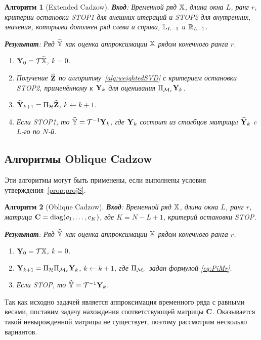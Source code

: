 \documentclass[12pt,a4paper,fleqn,leqno]{article}
\newtheorem{algorithm}{Алгоритм}%
\begin{document}
\begin{algorithm}[Extended Cadzow]
\textbf{Вход}: Временной ряд $\mathbb{X}$, длина окна $L$, ранг $r$,
критерии остановки STOP1 для внешних итераций и STOP2 для внутренних,
значения, которыми дополнен ряд слева и справа, $\mathbb{L}_{L-1}$ и $\mathbb{R}_{L-1}$.

\textbf{Результат}:
Ряд $\widehat{\mathbb{Y}}$ как оценка аппроксимации $\mathbb{X}$ рядом конечного ранга $r$.

\begin{enumerate}
\item
$\mathbf{Y}_0 = \mathcal{T} \widetilde{\mathbb{X}}$, $k=0$.
\item
Получение $\widehat{\mathbf{Z}}$ по алгоритму~\ref{alg:weightedSVD} с критерием остановки STOP2, применённому к $\mathbf{Y}_k$ для оценивания $\Pi_{\mathcal{M}_r} \mathbf{Y}_{k}$.
\item
$\widetilde{\mathbf{Y}}_{k+1} = \Pi_{\mathcal{H}}  \widehat{\mathbf{Z}}$, $k\leftarrow k+1$.
\item
Если STOP1, то $\widehat{\mathbb{Y}} = \mathcal{T}^{-1} \mathbf{Y}_k$, где $\mathbf{Y}_k$ состоит из столбцов матрицы $\widetilde{\mathbf{Y}}_{k}$
c $L$-го по $N$-й.
\end{enumerate}
\end{algorithm}

\subsection{Алгоритмы Oblique Cadzow}

Эти алгоритмы могут быть применены, если выполнены условия утверждения~\ref{prop:projS}.

\begin{algorithm}[Oblique Cadzow]
\label{alg:obliqueCadzow}
\textbf{Вход}: Временной ряд $\mathbb{X}$, длина окна $L$, ранг $r$, матрица $\mathbf{C}=\mathop{\mathrm{diag}}(c_1,\ldots, c_K)$, где $K=N-L+1$,
критерий остановки STOP.

\textbf{Результат}:
Ряд $\widehat{\mathbb{Y}}$ как оценка аппроксимации $\mathbb{X}$ рядом конечного ранга $r$.

\begin{enumerate}
\item
$\mathbf{Y}_0 = \mathcal{T} \mathbb{X}$, $k=0$.
\item
$\mathbf{Y}_{k+1} = \Pi_{\mathcal{H}}  \Pi_{\mathcal{M}_r} \mathbf{Y}_{k}$, $k\leftarrow k+1$, где 
$\Pi_{\mathcal{M}_r}$ задан формулой \eqref{eq:PiMr}.
\item
Если STOP, то $\widehat{\mathbb{Y}} = \mathcal{T}^{-1} \mathbf{Y}_k$.
\end{enumerate}
\end{algorithm}


Так как исходно задачей является аппроксимация временного ряда с равными весами, поставим задачу нахождения соответствующей матрицы $\mathbf{C}$.
Оказывается такой невырожденной матрицы не существует, поэтому рассмотрим несколько вариантов.
\end{document}
